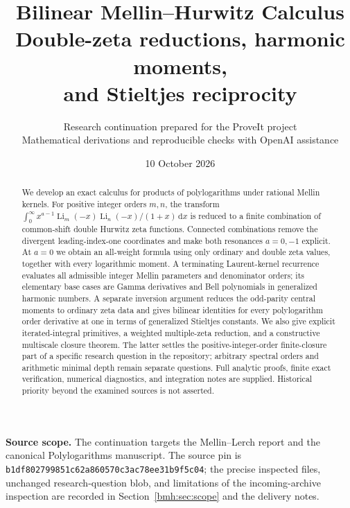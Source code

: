 \documentclass[11pt,a4paper]{article}
\title{\bfseries Bilinear Mellin--Hurwitz Calculus\\[5pt]
\large Double-zeta reductions, harmonic moments,\\and Stieltjes reciprocity}
\author{Research continuation prepared for the ProveIt project\\
\small Mathematical derivations and reproducible checks with OpenAI assistance}
\date{10 October 2026}
\numberwithin{equation}{section}
\theoremstyle{definition}
\DeclareMathOperator{\Li}{Li}
\newcommand{\dd}{\,\mathrm d}
\newcommand{\src}[1]{{\small\nolinkurl{#1}}}
\begin{document}
\maketitle
\thispagestyle{empty}
\begin{abstract}
We develop an exact calculus for products of polylogarithms under rational
Mellin kernels. For positive integer orders $m,n$, the transform
$\int_0^\infty x^{a-1}\Li_m(-x)\Li_n(-x)/(1+x)\dd x$ is reduced to a finite
combination of common-shift double Hurwitz zeta functions. Connected
combinations remove the divergent leading-index-one coordinates and make
both resonances $a=0,-1$ explicit. At $a=0$ we obtain an all-weight formula
using only ordinary and double zeta values, together with every logarithmic
moment. A terminating Laurent-kernel recurrence evaluates all admissible
integer Mellin parameters and denominator orders; its elementary base
cases are Gamma derivatives and Bell polynomials in generalized harmonic
numbers. A separate inversion argument reduces the odd-parity central
moments to ordinary zeta data and gives bilinear identities for every
polylogarithm order derivative at one in terms of generalized Stieltjes
constants. We also give explicit iterated-integral primitives, a weighted
multiple-zeta reduction, and a constructive multiscale closure theorem.
The latter settles the positive-integer-order finite-closure part of a
specific research question in the repository; arbitrary spectral orders
and arithmetic minimal depth remain separate questions. Full analytic
proofs, finite exact verification, numerical diagnostics, and integration
notes are supplied. Historical priority beyond the examined sources is
not asserted.
\end{abstract}
\vfill
\noindent\small\textbf{Source scope.} The continuation targets the Mellin--Lerch
report and the canonical Polylogarithms manuscript. The source pin is
\src{b1df802799851c62a860570c3ac78ee31b9f5c04}; the precise inspected files,
unchanged research-question blob, and limitations of the incoming-archive
inspection are recorded in Section~\ref{bmh:sec:scope} and the delivery notes.
\clearpage
\tableofcontents
\clearpage









\appendix


\end{document}
